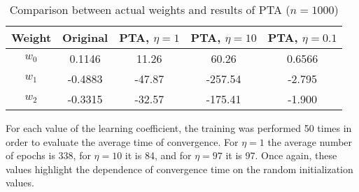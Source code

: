 \documentclass[12pt]{article}
\begin{document}
\begin{table}[h]
    \centering
    \begin{tabular}{|c|c|c|c|c|}
        \hline
        Weight & \textbf{Original} & \textbf{PTA}, $\eta=1$ & \textbf{PTA}, $\eta=10$ & \textbf{PTA}, $\eta=0.1$ \\ 
        \hline
        \hline
        $w_0$ & 0.1146 & 11.26 & 60.26 & 0.6566 \\
        \hline
        $w_1$ & -0.4883 & -47.87 & -257.54 & -2.795 \\
        \hline
        $w_2$ & -0.3315 & -32.57 & -175.41 & -1.900 \\
        \hline
    \end{tabular}
    \caption{Comparison between actual weights and results of PTA ($n=1000$)}
    \label{tab:eta-1000}
\end{table}

For each value of the learning coefficient, the training was performed 50 times in order to evaluate the average time of convergence.
For $\eta=1$ the average number of epochs is 338, for $\eta=10$ it is 84, and for $\eta=97$ it is 97.
Once again, these values highlight the dependence of convergence time on the random initialization values.
\end{document}
